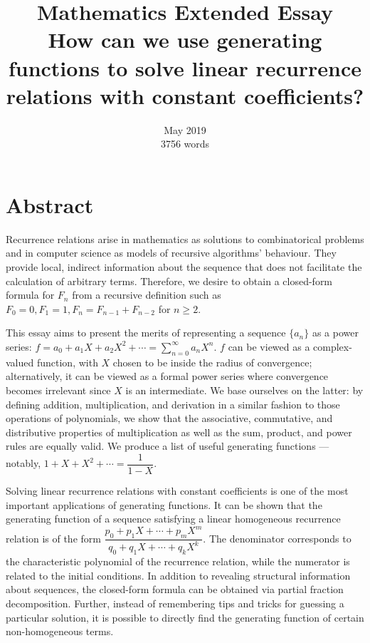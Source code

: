 \documentclass[a4paper, 12pt]{report}
\title{
    \Huge Mathematics Extended Essay\\
    \bigskip
    \Large How can we use generating functions to solve linear recurrence relations with constant coefficients?
}
\author{}
\date{
    May 2019\\
    \vspace{12.5cm}
    \small
    3756 words
}
\begin{document}
\thispagestyle{empty}
\maketitle


\chapter*{Abstract}
\thispagestyle{empty}
Recurrence relations arise in mathematics as solutions to combinatorical problems and in computer science as models of recursive algorithms' behaviour. They provide local, indirect information about the sequence that does not facilitate the calculation of arbitrary terms. Therefore, we desire to obtain a closed-form formula for $F_n$ from a recursive definition such as $F_0 = 0, F_1 = 1, F_n = F_{n - 1} + F_{n - 2}$ for $n \geq 2$.

This essay aims to present the merits of representing a sequence $\{a_n\}$ as a power series: $f = a_0 + a_1 X + a_2 X^2 + \cdots = \sum_{n = 0}^\infty a_n X^n$. $f$ can be viewed as a complex-valued function, with $X$ chosen to be inside the radius of convergence; alternatively, it can be viewed as a formal power series where convergence becomes irrelevant since $X$ is an intermediate. We base ourselves on the latter: by defining addition, multiplication, and derivation in a similar fashion to those operations of polynomials, we show that the associative, commutative, and distributive properties of multiplication as well as the sum, product, and power rules are equally valid. We produce a list of useful generating functions --- notably, $1 + X + X^2 + \cdots = \dfrac{1}{1 - X}$.

Solving linear recurrence relations with constant coefficients is one of the most important applications of generating functions. It can be shown that the generating function of a sequence satisfying a linear homogeneous recurrence relation is of the form $\dfrac{p_0 + p_1 X + \cdots + p_m X^m}{q_0 + q_1 X + \cdots + q_k X^k}$. The denominator corresponds to the characteristic polynomial of the recurrence relation, while the numerator is related to the initial conditions. In addition to revealing structural information about sequences, the closed-form formula can be obtained via partial fraction decomposition. Further, instead of remembering tips and tricks for guessing a particular solution, it is possible to directly find the generating function of certain non-homogeneous terms.
\end{document}
